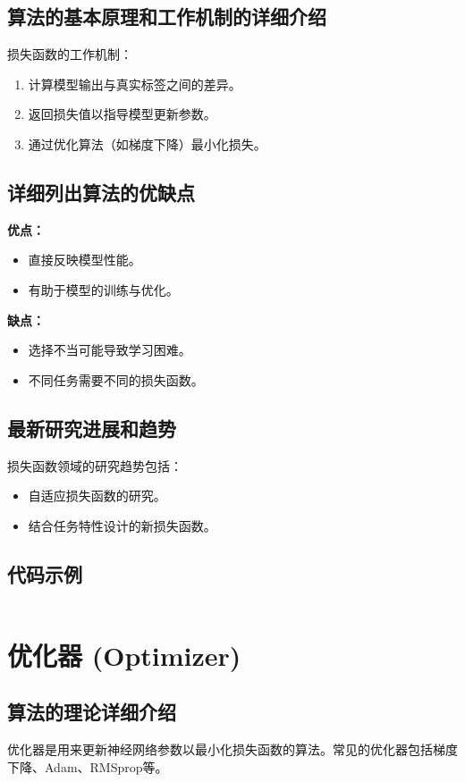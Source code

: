 \subsection*{算法的基本原理和工作机制的详细介绍}
损失函数的工作机制：
\begin{enumerate}
    \item 计算模型输出与真实标签之间的差异。
    \item 返回损失值以指导模型更新参数。
    \item 通过优化算法（如梯度下降）最小化损失。
\end{enumerate}

\subsection*{详细列出算法的优缺点}
\textbf{优点：}
\begin{itemize}
    \item 直接反映模型性能。
    \item 有助于模型的训练与优化。
\end{itemize}

\textbf{缺点：}
\begin{itemize}
    \item 选择不当可能导致学习困难。
    \item 不同任务需要不同的损失函数。
\end{itemize}

\subsection*{最新研究进展和趋势}
损失函数领域的研究趋势包括：
\begin{itemize}
    \item 自适应损失函数的研究。
    \item 结合任务特性设计的新损失函数。
\end{itemize}
\subsection*{代码示例}
\begin{lstlisting}

\end{lstlisting}


\section{优化器 (Optimizer)}
\subsection*{算法的理论详细介绍}
优化器是用来更新神经网络参数以最小化损失函数的算法。常见的优化器包括梯度下降、Adam、RMSprop等。

